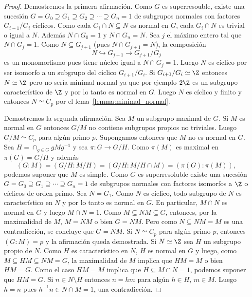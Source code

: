 \begin{proof}
	Demostremos la primera afirmación. 
	Como $G$ es superresouble, existe una sucesión $G=G_0\supseteq G_1\supseteq
	G_2\supseteq\cdots\supseteq G_n=1$ de subgrupos normales con factores
	$G_{i-1}/G_i$ cíclicos. Como cada $G_i\cap N\subseteq N$ es normal en $G$,
	cada $G_i\cap N$ es trivial o igual a $N$. Además $N\cap G_0=1$ y $N\cap
	G_n=N$. Sea $j$ el máximo entero tal que $N\cap G_j=1$. Como $N\subseteq
	G_{j+1}$ (pues $N\cap G_{j+1}=N$), la composición
	\[
	N\hookrightarrow G_{j+1}\to G_{j+1}/G_j
	\]
	es un monomorfismo pues tiene núcleo igual a $N\cap G_{j}=1$. Luego $N$ es
	cíclico por ser isomorfo a un subgrupo del cíclico $G_{i+1}/G_i$. Si
	$G_{i+1}/G_i\simeq\Z$ entonces $N\simeq\Z$ pero no sería minimal-normal ya
	que por ejemplo $2\Z$ es un subgrupo característico de $\Z$ y por lo tanto
	es normal en $G$. Luego $N$ es cíclico y finito y entonces $N\simeq C_p$
	por el lema~\ref{lemma:minimal_normal}.

	Demostremos la segunda afirmación. Sea $M$ un subgrupo maximal de $G$. 
	Si $M$ es normal en $G$ entonces $G/M$ no contiene subgrupos propios no
	triviales. 
	Luego $G/M\simeq C_p$ para algún
	primo $p$.  Supongamos entonces que $M$ no es normal en $G$. Sea $H=\cap_{g\in
	G}gMg^{-1}$ y sea $\pi\colon G\to G/H$.  Como $\pi(M)$ es maximal en
	$\pi(G)=G/H$ y además
	\[
		(G:M)=(G/H:M/H)=(G/H:M/H\cap M)=(\pi(G):\pi(M)),
	\]
	podemos suponer que $M$ es simple. Como $G$ es superresoluble
	existe una sucesión $G=G_0\supseteq G_1\supseteq\cdots\supseteq G_n=1$ de
	subgrupos normales con factores isomorfos a $\Z$ o cíclicos de orden primo.
	Sea $N=G_1$. Como $N$ es cíclico, todo subgrupo de $N$ es característico en
	$N$ y por lo tanto es normal en $G$. En particular, $M\cap N$ es normal en
	$G$ y luego $M\cap N=1$. Como $M\subseteq
	NM\subseteq G$, entonces, por la maximalidad de $M$, $M=NM$ o bien $G=NM$.
	Pero como $N\subseteq NM=M$ es una contradicción, se concluye que $G=NM$.
	Si $N\simeq C_p$ para algún primo $p$, entonces $(G:M)=p$ y la afirmación
	queda demostrada.  Si $N\simeq\Z$ sea $H$ un subgrupo propio de $N$. Como
	$H$ es característico en $N$, $H$ es normal en $G$ y luego, como
	$M\subseteq HM\subseteq NM=G$, la maximalidad de $M$ implica que $HM=M$ o
	bien $HM=G$. Como el caso $HM=M$ implica que $H\subseteq M\cap N=1$,
	podemos suponer que $HM=G$. Si $n\in N\setminus H$ entonces $n=hm$ para
	algún $h\in H$, $m\in M$. Luego $h=n$ pues $h^{-1}n\in N\cap M=1$, una
	contradicción.


\end{proof}
